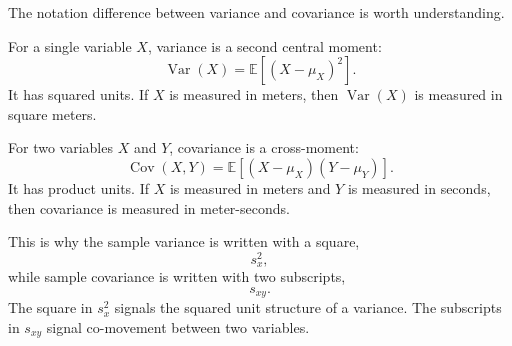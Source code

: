 The notation difference between variance and covariance is worth understanding.

For a single variable $X$, variance is a second central moment:
\begin{equation}
  \operatorname{Var}(X)=\mathbb{E}[(X-\mu_X)^2].
\end{equation}
It has squared units.  If $X$ is measured in meters, then $\operatorname{Var}(X)$ is measured in square meters.

For two variables $X$ and $Y$, covariance is a cross-moment:
\begin{equation}
  \operatorname{Cov}(X,Y)=\mathbb{E}[(X-\mu_X)(Y-\mu_Y)].
\end{equation}
It has product units.  If $X$ is measured in meters and $Y$ is measured in seconds, then covariance is measured in meter-seconds.

This is why the sample variance is written with a square,
\begin{equation}
  s_x^2,
\end{equation}
while sample covariance is written with two subscripts,
\begin{equation}
  s_{xy}.
\end{equation}
The square in $s_x^2$ signals the squared unit structure of a variance.  The subscripts in $s_{xy}$ signal co-movement between two variables.

